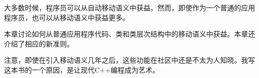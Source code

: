 大多数时候，程序员可以从自动移动语义中获益。然而，即使作为一个普通的应用程序员，也可以从移动语义中获益更多。\par

本章讨论如何从普通应用程序代码、类和类层次结构中的移动语义中获益。本章还介绍了相应的新准则。\par

注意，即使在引入移动语义几年之后，这些功能在社区中还是不太为人知晓。我写这本书的一个原因，是让现代C++编程成为艺术。\par